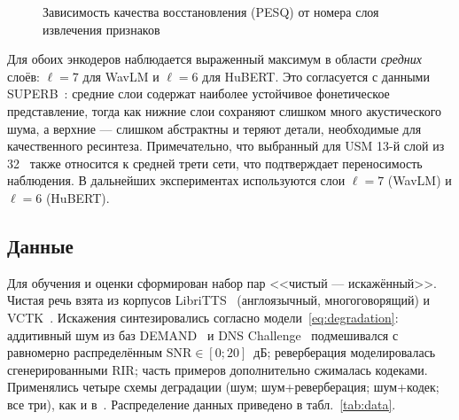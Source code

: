 \begin{figure}[H]
    \centering
    \caption{Зависимость качества восстановления (PESQ) от номера слоя
        извлечения признаков}
    \label{fig:layers}
\end{figure}

Для обоих энкодеров наблюдается выраженный максимум в области \emph{средних}
слоёв: $\ell = 7$ для WavLM и $\ell = 6$ для HuBERT. Это согласуется с данными
SUPERB~\cite{superb}: средние слои содержат наиболее устойчивое фонетическое
представление, тогда как нижние слои сохраняют слишком много акустического шума,
а верхние --- слишком абстрактны и теряют детали, необходимые для качественного
ресинтеза. Примечательно, что выбранный для USM 13-й слой из 32~\cite{miipher2}
также относится к средней трети сети, что подтверждает переносимость наблюдения.
В дальнейших экспериментах используются слои $\ell=7$ (WavLM) и $\ell=6$
(HuBERT).

\subsection{Данные}
\label{ssec:data}

Для обучения и оценки сформирован набор пар <<чистый — искажённый>>. Чистая речь
взята из корпусов LibriTTS~\cite{libritts} (англоязычный, многоговорящий) и
VCTK~\cite{vctk}. Искажения синтезировались согласно
модели~\eqref{eq:degradation}: аддитивный шум из баз DEMAND~\cite{demand} и DNS
Challenge~\cite{dnschallenge} подмешивался с равномерно распределённым
$\mathrm{SNR}\in[0;20]$~дБ; реверберация моделировалась сгенерированными RIR;
часть примеров дополнительно сжималась кодеками. Применялись четыре схемы
деградации (шум; шум+реверберация; шум+кодек; все три), как и в~\cite{miipher2}.
Распределение данных приведено в табл.~\ref{tab:data}.


